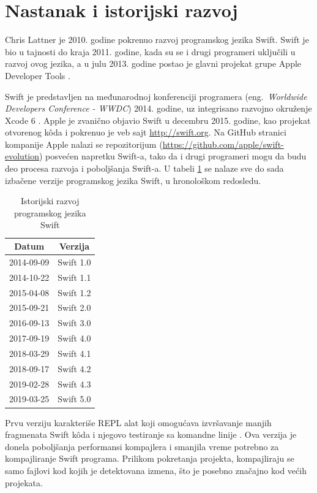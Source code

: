 \documentclass[a4paper]{article}
\begin{document}
\section{Nastanak i istorijski razvoj}
\label{sec:drugiDeo}
Chris Lattner je 2010. godine pokrenuo razvoj programskog jezika Swift. Swift je bio u tajnosti do kraja 2011. godine, kada su se i drugi programeri uključili u razvoj ovog jezika, a u julu 2013. godine postao je glavni projekat grupe Apple Developer Tools \cite{mastering_swift3}. 

Swift je predstavljen na međunarodnoj konferenciji programera (eng.~{\em Worldwide Developers Conference - WWDC}) 2014. godine, uz integrisano razvojno okruženje Xcode 6 \cite{thenextweb_sajt}. Apple je zvanično objavio Swift u decembru 2015. godine, kao projekat otvorenog k\^{o}da i pokrenuo je veb sajt \url{http://swift.org}. Na GitHub stranici kompanije Apple nalazi se repozitorijum (\url{https://github.com/apple/swift-evolution}) posvećen napretku Swift-a, tako da i drugi programeri mogu da budu deo procesa razvoja i poboljšanja Swift-a. U tabeli \ref{tab:razvoj} se nalaze sve do sada izbačene verzije programskog jezika Swift, u hronološkom redosledu.

\begin{table}[h!]
\begin{center}
\caption{Istorijski razvoj programskog jezika Swift}
\begin{tabular}{|c|c|} \hline
\label{tab:razvoj}
\textbf{Datum} & \textbf{Verzija} \\ \hline
2014-09-09 & Swift 1.0 \\ \hline
2014-10-22 & Swift 1.1 \\ \hline
2015-04-08 & Swift 1.2 \\ \hline
2015-09-21 & Swift 2.0 \\ \hline
2016-09-13 & Swift 3.0 \\ \hline
2017-09-19 & Swift 4.0 \\ \hline
2018-03-29 & Swift 4.1 \\ \hline
2018-09-17 & Swift 4.2 \\ \hline
2019-02-28 & Swift 4.3 \\ \hline
2019-03-25 & Swift 5.0 \\ \hline
\end{tabular}
\end{center}
\end{table}

Prvu verziju karakteriše REPL alat koji omogućava izvršavanje  manjih fragmenata Swift k\^{o}da i njegovo testiranje sa komandne linije \cite{swiftdev_sajt}. Ova verzija je donela poboljšanja performansi kompajlera i smanjila vreme potrebno za kompajliranje Swift programa. Prilikom pokretanja projekta, kompajliraju se samo fajlovi kod kojih je detektovana izmena, što je posebno značajno kod većih projekata. 
\end{document}
